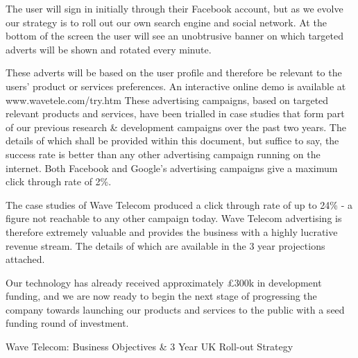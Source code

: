 \documentclass[letterpaper,10pt,openany,oneside,english]{sphinxmanual}
\begin{document}
The user will sign in initially through their Facebook account, but as we evolve our strategy is to
roll out our own search engine and social network. At the bottom of the screen the user will
see an unobtrusive banner on which targeted adverts will be shown and rotated every minute.

These adverts will be based on the user profile and therefore be relevant to the users’ product
or services preferences. An interactive online demo is available at www.wavetele.com/try.htm
These advertising campaigns, based on targeted relevant products and services, have been
trialled in case studies that form part of our previous research \& development campaigns over
the past two years. The details of which shall be provided within this document, but suffice to
say, the success rate is better than any other advertising campaign running on the internet.
Both Facebook and Google’s advertising campaigns give a maximum click through rate of 2\%.

The case studies of Wave Telecom produced a click through rate of up to 24\% - a figure not
reachable to any other campaign today.
Wave Telecom advertising is therefore extremely valuable and provides the business with a
highly lucrative revenue stream. The details of which are available in the 3 year projections
attached.

Our technology has already received approximately £300k in development funding, and we are
now ready to begin the next stage of progressing the company towards launching our products
and services to the public with a seed funding round of investment.

Wave Telecom: Business Objectives \& 3 Year UK Roll-out Strategy
\end{document}

